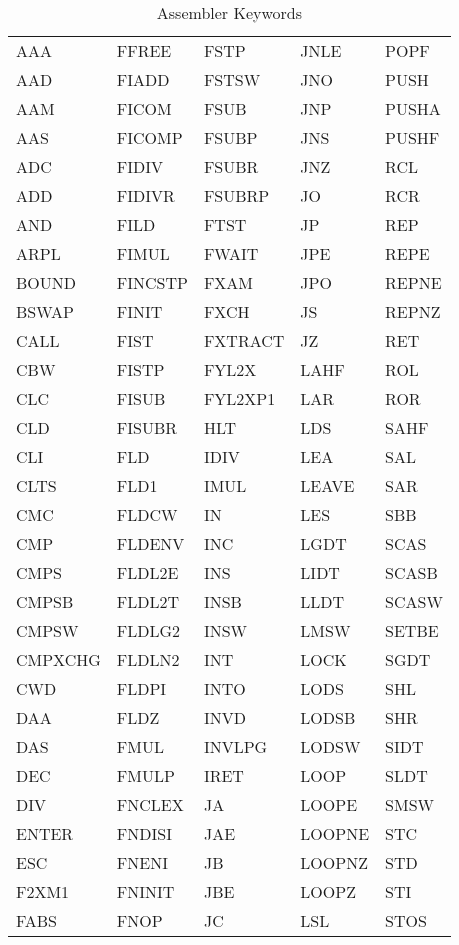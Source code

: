 \begin{table}
\caption{Assembler Keywords}

\begin{tabular}{p{2.5cm} p{2.5cm} p{2.5cm} p{2.5cm} p{2.5cm}}
\\
AAA & FFREE & FSTP & JNLE & POPF\\
AAD & FIADD & FSTSW & JNO & PUSH\\
AAM & FICOM & FSUB & JNP & PUSHA\\
AAS & FICOMP & FSUBP & JNS & PUSHF\\
ADC & FIDIV & FSUBR & JNZ & RCL\\
ADD & FIDIVR & FSUBRP & JO & RCR\\
AND & FILD & FTST & JP & REP\\
ARPL & FIMUL & FWAIT & JPE & REPE\\
BOUND & FINCSTP & FXAM & JPO & REPNE\\
BSWAP & FINIT & FXCH & JS & REPNZ\\
CALL & FIST & FXTRACT & JZ & RET\\
CBW & FISTP & FYL2X & LAHF & ROL\\
CLC & FISUB & FYL2XP1 & LAR & ROR\\
CLD & FISUBR & HLT & LDS & SAHF\\
CLI & FLD & IDIV & LEA & SAL\\
CLTS & FLD1 & IMUL & LEAVE & SAR\\
CMC & FLDCW & IN & LES & SBB\\
CMP & FLDENV & INC & LGDT & SCAS\\
CMPS & FLDL2E & INS & LIDT & SCASB\\
CMPSB & FLDL2T & INSB & LLDT & SCASW\\
CMPSW & FLDLG2 & INSW & LMSW & SETBE\\
CMPXCHG & FLDLN2 & INT & LOCK & SGDT\\
CWD & FLDPI & INTO & LODS & SHL\\
DAA & FLDZ & INVD & LODSB & SHR\\
DAS & FMUL & INVLPG & LODSW & SIDT\\
DEC & FMULP & IRET & LOOP & SLDT\\
DIV & FNCLEX & JA & LOOPE & SMSW\\
ENTER & FNDISI & JAE & LOOPNE & STC\\
ESC & FNENI & JB & LOOPNZ & STD\\
F2XM1 & FNINIT & JBE & LOOPZ & STI\\
FABS & FNOP & JC & LSL & STOS\\

\end{tabular}
\end{table}

